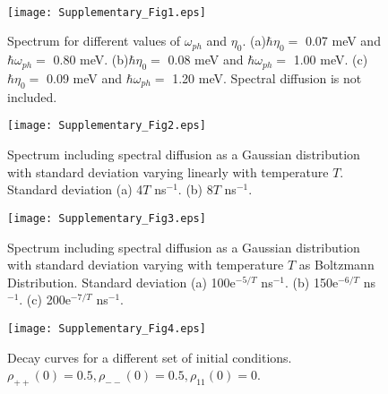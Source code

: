 \documentclass[aps,pra,preprint,groupedaddress]{revtex4-1}
\begin{document}
\\
\\
\\


\bigskip

\begin{figure}[htbp]
\renewcommand{\figurename}{\textbf{Figure S}}
\texttt{[image: Supplementary\_Fig1.eps]}
\caption{Spectrum for different values of $\omega_{ph}$ and $\eta_0$. (a)$\hbar\eta_0 =$ 0.07 meV and $\hbar\omega_{ph} =$ 0.80 meV. (b)$\hbar\eta_0 =$ 0.08 meV and $\hbar\omega_{ph} =$ 1.00 meV.  (c)$\hbar\eta_0 =$ 0.09 meV and $\hbar\omega_{ph} =$ 1.20 meV. Spectral diffusion is not included.}
\label{Fig:Spectrum_extra}
\end{figure}

\begin{figure}[htbp]
\renewcommand{\figurename}{\textbf{Figure S}}
\texttt{[image: Supplementary\_Fig2.eps]}
\caption{Spectrum including spectral diffusion as a Gaussian distribution with standard deviation varying linearly with temperature $T$. Standard deviation (a) 4$T$ ns$^{-1}$. (b) 8$T$ ns$^{-1}$.}
\label{Fig:Spectrum_extra_SpectralDiffusion_Linear}
\end{figure}

\begin{figure}[htbp]
\renewcommand{\figurename}{\textbf{Figure S}}
\texttt{[image: Supplementary\_Fig3.eps]}
\caption{Spectrum including spectral diffusion as a Gaussian distribution with standard deviation varying with temperature $T$ as Boltzmann Distribution. Standard deviation (a) 100e$^{-5/T}$ ns$^{-1}$. (b) 150e$^{-6/T}$ ns$^{-1}$.  (c) 200e$^{-7/T}$ ns$^{-1}$.}
\label{Fig:Spectrum_extra_SpectralDiffusion_exp}
\end{figure}

\begin{figure}[htbp]
\renewcommand{\figurename}{\textbf{Figure S}}
\texttt{[image: Supplementary\_Fig4.eps]}
\caption{Decay curves for a different set of initial conditions. $\rho_{++}(0) = 0.5, \rho_{--}(0) = 0.5, \rho_{11}(0) = 0$.}
\label{Fig:Lifetime_extra}
\end{figure}
\end{document}
